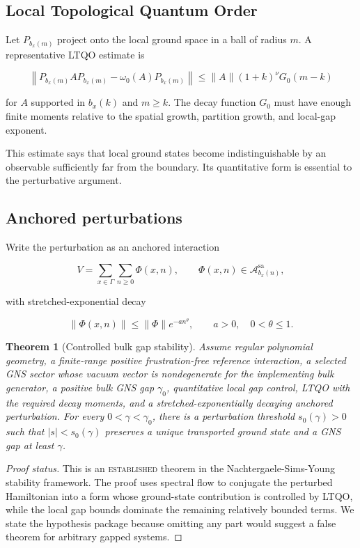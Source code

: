 \documentclass[12pt]{article}
\newtheorem{theorem}{Theorem}[section]
\theoremstyle{definition}
\theoremstyle{remark}
\newcommand{\A}{\mathcal A}
\newcommand{\status}[1]{\textsc{#1}}
\begin{document}
\subsection{Local Topological Quantum Order}

Let $P_{b_x(m)}$ project onto the local ground space in a ball of radius $m$.
A representative LTQO estimate is

\[
\left\|
P_{b_x(m)}AP_{b_x(m)}
-\omega_0(A)P_{b_x(m)}
\right\|
\leq
\|A\|(1+k)^\nu G_0(m-k)
\]

for $A$ supported in $b_x(k)$ and $m\geq k$. The decay function $G_0$ must
have enough finite moments relative to the spatial growth, partition growth,
and local-gap exponent.

This estimate says that local ground states become indistinguishable by an
observable sufficiently far from the boundary. Its quantitative form is
essential to the perturbative argument.

\subsection{Anchored perturbations}

Write the perturbation as an anchored interaction

\[
V=\sum_{x\in\Gamma}\sum_{n\geq0}\Phi(x,n),
\qquad
\Phi(x,n)\in\A_{b_x(n)}^{\mathrm{sa}},
\]

with stretched-exponential decay

\[
\|\Phi(x,n)\|
\leq
\|\Phi\|e^{-an^\theta},
\qquad
a>0,
\quad
0<\theta\leq1.
\]

\begin{theorem}[Controlled bulk gap stability]
\label{thm:controlled-stability}
Assume regular polynomial geometry, a finite-range positive
frustration-free reference interaction, a selected GNS sector whose vacuum
vector is nondegenerate for the implementing bulk generator,
a positive bulk GNS gap $\gamma_0$, quantitative local gap control, LTQO with
the required decay moments, and a stretched-exponentially decaying anchored
perturbation. For every $0<\gamma<\gamma_0$, there is a perturbation threshold
$s_0(\gamma)>0$ such that $|s|<s_0(\gamma)$ preserves a unique transported
ground state and a GNS gap at least $\gamma$.
\end{theorem}

\begin{proof}[Proof status]
This is an \status{established} theorem in the Nachtergaele-Sims-Young
stability framework. The proof uses spectral flow to conjugate the perturbed
Hamiltonian into a form whose ground-state contribution is controlled by
LTQO, while the local gap bounds dominate the remaining relatively bounded
terms. We state the hypothesis package because omitting any part would suggest
a false theorem for arbitrary gapped systems.
\end{proof}
\end{document}
